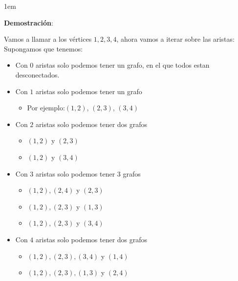 \documentclass[12pt, fleqn]{article}                            %
\newenvironment{SmallIndentation}[1][0.75em]                    %
        {\begin{adjustwidth}{#1}{}\begin{footnotesize}}             %
        {\end{footnotesize}\end{adjustwidth}}                       %
\theoremstyle{break}                                            %
\begin{document}
    \begin{SmallIndentation}[1em]
        \textbf{Demostración}:

            Vamos a llamar a los vértices $1, 2, 3, 4$, ahora vamos a iterar sobre las aristas:
            Supongamos que tenemos:
            \begin{itemize}
                \item Con $0$ aristas solo podemos tener un grafo, en el que todos estan desconectados.
                \item Con $1$ aristas solo podemos tener un grafo \\
                    \begin{itemize}
                        \item Por ejemplo:$(1,2)$, $(2, 3)$, $(3, 4)$
                    \end{itemize}
                    
                \item Con $2$ aristas solo podemos tener dos grafos \\
                    \begin{itemize}
                        \item $(1,2)$ y $(2,3)$
                        \item $(1,2)$ y $(3,4)$
                    \end{itemize}
                
                \item Con $3$ aristas solo podemos tener 3 grafos \\
                    \begin{itemize}
                        \item $(1,2), (2,4)$ y $(2,3)$
                        \item $(1,2), (2,3)$ y $(1,3)$
                        \item $(1,2), (2,3)$ y $(3,4)$
                    \end{itemize}

                \item Con $4$ aristas solo podemos tener dos grafos \\
                    \begin{itemize}
                        \item $(1,2), (2,3), (3,4)$ y $(1,4)$
                        \item $(1,2), (2,3), (1,3)$ y $(2,4)$
                    \end{itemize}


\end{itemize}
\end{SmallIndentation}
\end{document}
